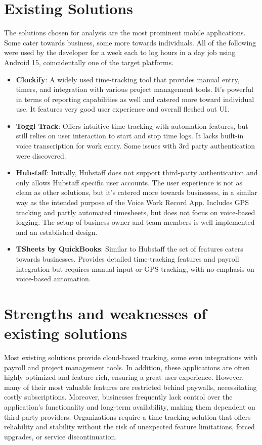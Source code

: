 \documentclass[
  digital,     %
  oneside,     %
  nosansbold,  %
  nocolorbold, %
  lof,         %
  lot,         %
]{fithesis4}
\begin{document}
\section{Existing Solutions}

The solutions chosen for analysis are the most prominent mobile applications. Some cater towards business, some more towards individuals. All of the following were used by the developer for a week each to log hours in a day job using Android 15, coincidentally one of the target platforms.

\begin{itemize}
\item \textbf{Clockify}: A widely used time-tracking tool that provides manual entry, timers, and integration with various project management tools. It's powerful in terms of reporting capabilities as well and catered more toward individual use. It features very good user experience and overall fleshed out \gls{UI}.
\item \textbf{Toggl Track}: Offers intuitive time tracking with automation features, but still relies on user interaction to start and stop time logs. It lacks built-in voice transcription for work entry. Some issues with 3rd party authentication were discovered.
\item \textbf{Hubstaff}: Initially, Hubstaff does not support third-party authentication and only allows Hubstaff specific user accounts. The user experience is not as clean as other solutions, but it's catered more towards businesses, in a similar way as the intended purpose of the Voice Work Record App. Includes \gls{GPS} tracking and partly automated timesheets, but does not focus on voice-based logging. The setup of business owner and team members is well implemented and an established design.
\item \textbf{TSheets by QuickBooks}: Similar to Hubstaff the set of features caters towards businesses. Provides detailed time-tracking features and payroll integration but requires manual input or \gls{GPS} tracking, with no emphasis on voice-based automation.
\end{itemize}

\section{Strengths and weaknesses of existing solutions}

Most existing solutions provide cloud-based tracking, some even integrations with payroll and project management tools. In addition, these applications are often highly optimized and feature rich, ensuring a great user experience. However, many of their most valuable features are restricted behind paywalls, necessitating costly subscriptions. Moreover, businesses frequently lack control over the application's functionality and long-term availability, making them dependent on third-party providers. Organizations require a time-tracking solution that offers reliability and stability without the risk of unexpected feature limitations, forced upgrades, or service discontinuation. 
\end{document}

